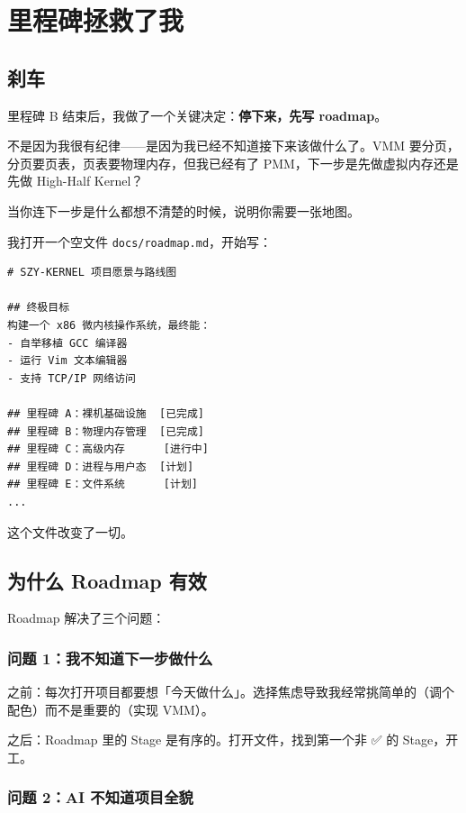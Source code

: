 \chapter{里程碑拯救了我}

\section{刹车}

里程碑 B 结束后，我做了一个关键决定：\textbf{停下来，先写 roadmap}。

不是因为我很有纪律——是因为我已经不知道接下来该做什么了。VMM 要分页，分页要页表，页表要物理内存，但我已经有了 PMM，下一步是先做虚拟内存还是先做 High-Half Kernel？

当你连下一步是什么都想不清楚的时候，说明你需要一张地图。

我打开一个空文件 \texttt{docs/roadmap.md}，开始写：

\begin{lstlisting}[style=yamlstyle]
# SZY-KERNEL 项目愿景与路线图

## 终极目标
构建一个 x86 微内核操作系统，最终能：
- 自举移植 GCC 编译器
- 运行 Vim 文本编辑器
- 支持 TCP/IP 网络访问

## 里程碑 A：裸机基础设施  [已完成]
## 里程碑 B：物理内存管理  [已完成]
## 里程碑 C：高级内存      [进行中]
## 里程碑 D：进程与用户态  [计划]
## 里程碑 E：文件系统      [计划]
...
\end{lstlisting}

这个文件改变了一切。

\section{为什么 Roadmap 有效}

Roadmap 解决了三个问题：

\subsection{问题 1：我不知道下一步做什么}

之前：每次打开项目都要想「今天做什么」。选择焦虑导致我经常挑简单的（调个配色）而不是重要的（实现 VMM）。

之后：Roadmap 里的 Stage 是有序的。打开文件，找到第一个非 ✅ 的 Stage，开工。

\subsection{问题 2：AI 不知道项目全貌}

